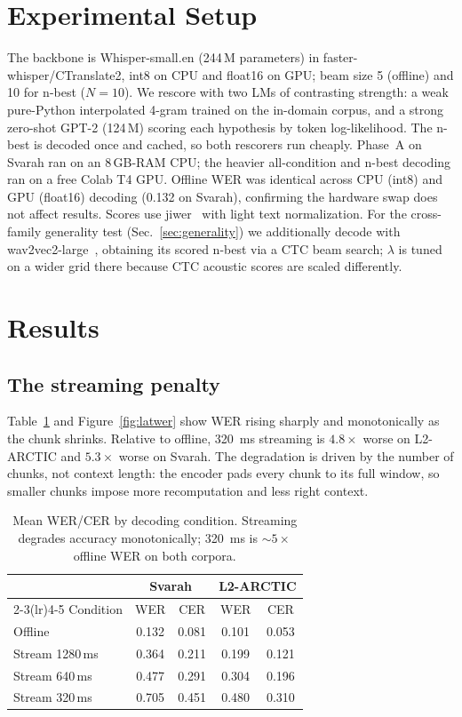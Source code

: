 \documentclass[conference]{IEEEtran}
\begin{document}
\section{Experimental Setup}
The backbone is Whisper-small.en (244\,M parameters) in faster-whisper/CTranslate2, int8 on CPU and float16 on GPU; beam size 5 (offline) and 10 for n-best ($N=10$). We rescore with two LMs of contrasting strength: a weak pure-Python interpolated 4-gram trained on the in-domain corpus, and a strong zero-shot GPT-2 (124\,M) scoring each hypothesis by token log-likelihood. The n-best is decoded once and cached, so both rescorers run cheaply. Phase~A on Svarah ran on an 8\,GB-RAM CPU; the heavier all-condition and n-best decoding ran on a free Colab T4 GPU. Offline WER was identical across CPU (int8) and GPU (float16) decoding (0.132 on Svarah), confirming the hardware swap does not affect results. Scores use jiwer~\cite{jiwer} with light text normalization. For the cross-family generality test (Sec.~\ref{sec:generality}) we additionally decode with wav2vec2-large~\cite{wav2vec2}, obtaining its scored n-best via a CTC beam search; $\lambda$ is tuned on a wider grid there because CTC acoustic scores are scaled differently.

\section{Results}
\subsection{The streaming penalty}
Table~\ref{tab:stream} and Figure~\ref{fig:latwer} show WER rising sharply and monotonically as the chunk shrinks. Relative to offline, 320~ms streaming is $4.8\times$ worse on L2-ARCTIC and $5.3\times$ worse on Svarah. The degradation is driven by the number of chunks, not context length: the encoder pads every chunk to its full window, so smaller chunks impose more recomputation and less right context.

\begin{table}[t]
\centering
\caption{Mean WER/CER by decoding condition. Streaming degrades accuracy monotonically; 320~ms is $\sim5\times$ offline WER on both corpora.}
\label{tab:stream}
\begin{tabular}{@{}lcccc@{}}
\toprule
& \multicolumn{2}{c}{Svarah} & \multicolumn{2}{c}{L2-ARCTIC} \\
\cmidrule(lr){2-3}\cmidrule(lr){4-5}
Condition & WER & CER & WER & CER \\
\midrule
Offline & 0.132 & 0.081 & 0.101 & 0.053 \\
Stream 1280\,ms & 0.364 & 0.211 & 0.199 & 0.121 \\
Stream 640\,ms & 0.477 & 0.291 & 0.304 & 0.196 \\
Stream 320\,ms & 0.705 & 0.451 & 0.480 & 0.310 \\
\bottomrule
\end{tabular}
\end{table}
\end{document}
